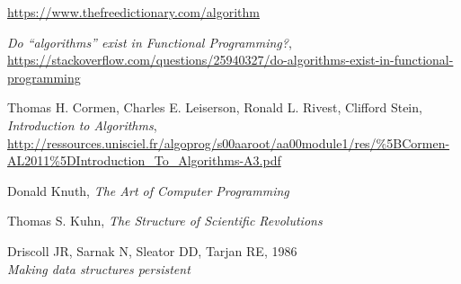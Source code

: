 \documentclass[declaration,mgr,english,shortabstract]{iithesis}
\begin{document}
\begin{thebibliography}{1}

    \url{https://www.thefreedictionary.com/algorithm}

    \textit{Do ``algorithms'' exist in Functional Programming?}, \\
    \url{https://stackoverflow.com/questions/25940327/do-algorithms-exist-in-functional-programming}

    Thomas H. Cormen, Charles E. Leiserson, Ronald L. Rivest, Clifford Stein, \\
    \textit{Introduction to Algorithms}, \\
    \url{http://ressources.unisciel.fr/algoprog/s00aaroot/aa00module1/res/%5BCormen-AL2011%5DIntroduction_To_Algorithms-A3.pdf}

    Donald Knuth, \textit{The Art of Computer Programming}

    Thomas S. Kuhn, \textit{The Structure of Scientific Revolutions}

    Driscoll JR, Sarnak N, Sleator DD, Tarjan RE, 1986 \\
    \textit{Making data structures persistent}

\end{thebibliography}
\end{document}
